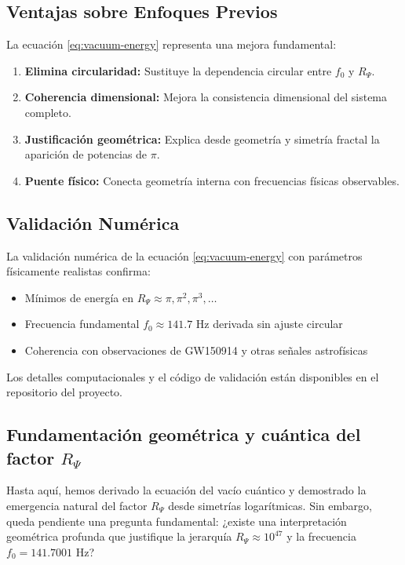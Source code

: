 \subsection{Ventajas sobre Enfoques Previos}

La ecuación \eqref{eq:vacuum-energy} representa una mejora fundamental:

\begin{enumerate}
  \item \textbf{Elimina circularidad:} Sustituye la dependencia circular entre $f_0$ y $R_\Psi$.
  \item \textbf{Coherencia dimensional:} Mejora la consistencia dimensional del sistema completo.
  \item \textbf{Justificación geométrica:} Explica desde geometría y simetría fractal la aparición de potencias de $\pi$.
  \item \textbf{Puente físico:} Conecta geometría interna con frecuencias físicas observables.
\end{enumerate}

\subsection{Validación Numérica}

La validación numérica de la ecuación \eqref{eq:vacuum-energy} con parámetros físicamente realistas confirma:
\begin{itemize}
  \item Mínimos de energía en $R_\Psi \approx \pi, \pi^2, \pi^3, \ldots$
  \item Frecuencia fundamental $f_0 \approx 141.7$ Hz derivada sin ajuste circular
  \item Coherencia con observaciones de GW150914 y otras señales astrofísicas
\end{itemize}

Los detalles computacionales y el código de validación están disponibles en el repositorio del proyecto.

\subsection{Fundamentación geométrica y cuántica del factor $R_\Psi$}

Hasta aquí, hemos derivado la ecuación del vacío cuántico y demostrado la emergencia natural del factor $R_\Psi$ desde simetrías logarítmicas. Sin embargo, queda pendiente una pregunta fundamental: ¿existe una interpretación geométrica profunda que justifique la jerarquía $R_\Psi \approx 10^{47}$ y la frecuencia $f_0 = 141.7001$ Hz?

